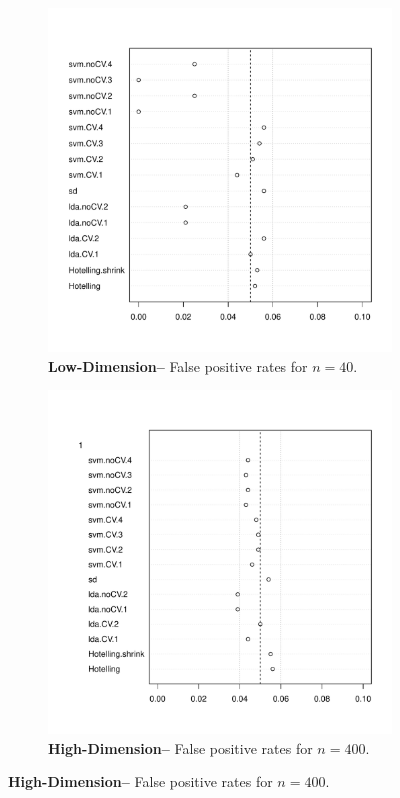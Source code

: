 \documentclass[12pt,a4paper]{article}
\theoremstyle{definition}
\newcommand{\mycaption}{Simulation details in Appendix~\ref{apx:simulation_details} except the changes in the sub-captions.}
\begin{document}
\begin{figure}[h]
\centering
\caption{\mycaption}	
\label{fig:large_sample}
	\begin{subfigure}{.5\textwidth}
	  \centering
	  \includegraphics[width=1\linewidth]{"art/2016-07-27 11:42:05zoom"}
	  \caption{\textbf{Low-Dimension--} False positive rates for $n=40$.} 
	\label{fig:large_sample_1}
	\end{subfigure}%
	\begin{subfigure}{.5\textwidth}
	  \centering
	  \includegraphics[width=1\linewidth]{"art/2016-08-04 13:59:33zoom"}
	  \caption{\textbf{High-Dimension--} False positive rates for $n=400$.} 
	\label{fig:large_sample_2}
	\end{subfigure}
\end{figure}
\end{document}
